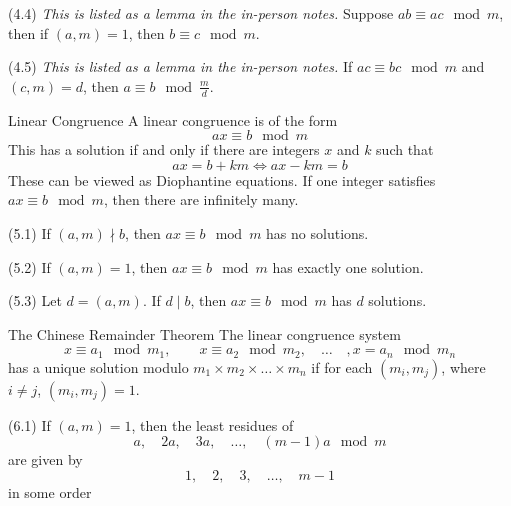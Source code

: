 \documentclass[12pt]{article}
\begin{document}
\begin{theorem}{(4.4)}{}
    \textit{This is listed as a lemma in the in-person notes.}
    \medskip
    \newline
    Suppose $ ab \equiv ac \mod m $, then if $ \left( a, m \right) = 1 $, then $ b \equiv c \mod m $.
\end{theorem}
\begin{theorem}{(4.5)}{}
    \textit{This is listed as a lemma in the in-person notes.}
    \medskip
    \newline
    If $ ac \equiv bc \mod m $ and $ \left( c, m \right) = d $, then $ a \equiv b \mod \frac{m}{d} $.
\end{theorem}
\begin{definition}{Linear Congruence}{}
    A linear congruence is of the form
    \[ ax \equiv b \mod m \]
    This has a solution if and only if there are integers $ x $ and $ k $ such that
    \[ ax = b + km \Leftrightarrow ax - km = b\]
    These can be viewed as Diophantine equations.
    \medskip
    \newline
    If one integer satisfies $ ax \equiv b \mod m $, then there are infinitely many.
\end{definition}
\begin{lemma}{(5.1)}{}
    If $ \left( a, m \right) \nmid b $, then $ ax \equiv b \mod m $ has no solutions.
\end{lemma}
\begin{lemma}{(5.2)}{}
    If $ \left( a, m \right) = 1 $, then $ ax \equiv b \mod m $ has exactly one solution.
\end{lemma}
\begin{lemma}{(5.3)}{}
    Let $ d = \left( a, m \right) $. If $ d \mid b $, then $ ax \equiv b \mod m $ has $ d $ solutions.
\end{lemma}
\begin{theorem}{The Chinese Remainder Theorem}{}
    The linear congruence system
    \[ x \equiv a_1 \mod m_1, \qquad x \equiv a_2 \mod m_2, \quad \dots \quad, x = a_n \mod m_n \]
    has a unique solution modulo $ m_1 \times m_2 \times \dots \times m_n $ if for each $ \left( m_i, m_j \right) $, where $ i \neq j $, $ \left( m_i, m_j \right) = 1 $.
\end{theorem}
\begin{lemma}{(6.1)}{}
    If $ \left( a, m \right) = 1 $, then the least residues of
    \[ a, \quad 2a, \quad 3a, \quad \dots, \quad \left( m - 1 \right) a \mod m \]
    are given by
    \[ 1, \quad 2, \quad 3, \quad \dots, \quad m - 1 \]
    in some order
\end{lemma}
\end{document}
